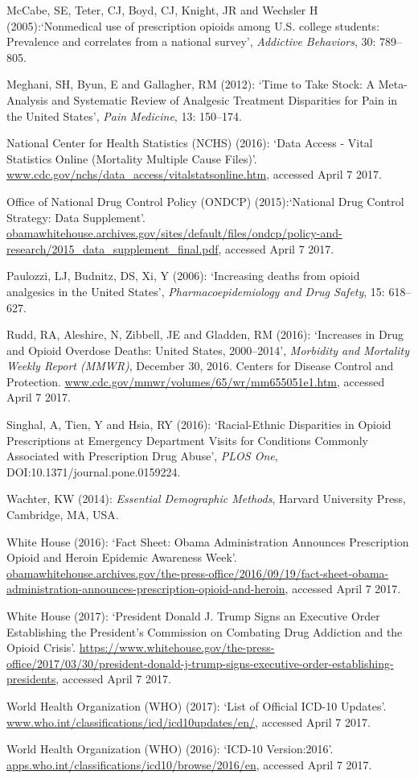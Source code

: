 \documentclass[12pt, a4paper]{article}
\begin{document}
\begin{description}
\item McCabe, SE, Teter, CJ, Boyd, CJ, Knight, JR and Wechsler H (2005):`Nonmedical use of prescription opioids among U.S. college students: Prevalence and correlates from a national survey', \textit{Addictive Behaviors}, 30: 789--805.
\item Meghani, SH, Byun, E and Gallagher, RM (2012): `Time to Take Stock: A Meta-Analysis and Systematic Review of Analgesic Treatment Disparities for Pain in the United States', \textit{Pain Medicine}, 13: 150--174.
\item National Center for Health Statistics (NCHS) (2016): `Data Access - Vital Statistics Online (Mortality Multiple Cause Files)'. \url{www.cdc.gov/nchs/data_access/vitalstatsonline.htm}, accessed April 7 2017. 
\item Office of National Drug Control Policy (ONDCP) (2015):`National Drug Control Strategy: Data Supplement'. \url{obamawhitehouse.archives.gov/sites/default/files/ondcp/policy-and-research/2015_data_supplement_final.pdf}, accessed April 7 2017. 
\item Paulozzi, LJ, Budnitz, DS, Xi, Y (2006): `Increasing deaths from opioid analgesics in the United States', \textit{Pharmacoepidemiology and Drug Safety}, 15: 618--627. 
\item Rudd, RA, Aleshire, N, Zibbell, JE and Gladden, RM (2016): `Increases in Drug and Opioid Overdose Deaths: United States, 2000--2014', \textit{Morbidity and Mortality Weekly Report (MMWR)}, December 30, 2016. Centers for Disease Control and Protection. \url{www.cdc.gov/mmwr/volumes/65/wr/mm655051e1.htm}, accessed April 7 2017.
\item Singhal, A, Tien, Y and Hsia, RY (2016): `Racial-Ethnic Disparities in Opioid Prescriptions at Emergency Department Visits for Conditions Commonly Associated with Prescription Drug Abuse', \textit{PLOS One}, DOI:10.1371/journal.pone.0159224.
\item Wachter, KW (2014): \textit{Essential Demographic Methods}, Harvard University Press, Cambridge, MA, USA.  
\item White House (2016): `Fact Sheet: Obama Administration Announces Prescription Opioid and Heroin Epidemic Awareness Week'. \url{obamawhitehouse.archives.gov/the-press-office/2016/09/19/fact-sheet-obama-administration-announces-prescription-opioid-and-heroin}, accessed April 7 2017.
\item White House (2017): `President Donald J. Trump Signs an Executive Order Establishing the President's Commission on Combating Drug Addiction and the Opioid Crisis'. \url{https://www.whitehouse.gov/the-press-office/2017/03/30/president-donald-j-trump-signs-executive-order-establishing-presidents}, accessed April 7 2017.
\item World Health Organization (WHO) (2017): `List of Official ICD-10 Updates'. \url{www.who.int/classifications/icd/icd10updates/en/}, accessed April 7 2017.
\item World Health Organization (WHO) (2016): `ICD-10 Version:2016'. \url{apps.who.int/classifications/icd10/browse/2016/en}, accessed April 7 2017.
\end{description}
\end{document}
